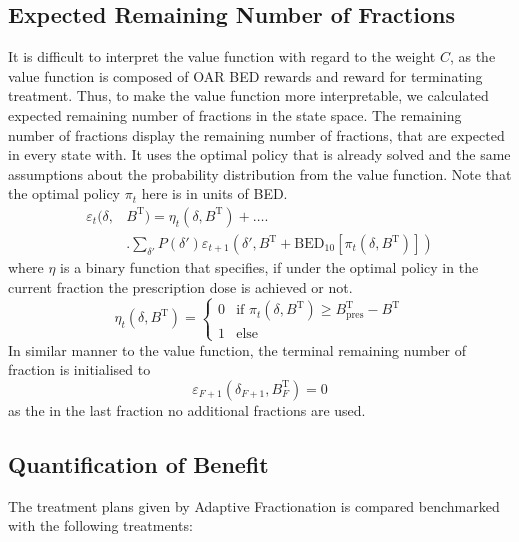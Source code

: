 \documentclass[\relativeRoot/ada.tex]{subfiles}
\begin{document}
\subsection{Expected Remaining Number of Fractions}
It is difficult to interpret the value function with regard to the weight $C$, as the value function is composed of OAR BED rewards and reward for terminating treatment. Thus, to make the value function more interpretable, we calculated expected remaining number of fractions in the state space. The remaining number of fractions display the remaining number of fractions, that are expected in every state with. It uses the optimal policy that is already solved and the same assumptions about the probability distribution from the value function. Note that the optimal policy $\pi_t$ here is in units of BED.
\begin{equation}\label{eq:remains_function}
    \begin{split}
    \varepsilon_t(\delta, & B^{\text{T}}) =
    \eta _t (\delta, B^{\text{T}}) + \ldots \Biggr.\\
    & \Biggr. \sum_{\delta'}P(\delta') \varepsilon_{t+1} \left( \delta', B^{\text{T}} + \text{BED}_{10} \left[ \pi_t(\delta, B^{\text{T}}) \right] \right)
    \end{split}
\end{equation}
where $\eta$ is a binary function that specifies, if under the optimal policy in the current fraction the prescription dose is achieved or not.
\begin{equation}\label{eq:current_remains}
    \eta_t (\delta, B^{\text{T}}) =
    \begin{cases}
        0 & \text{if } \pi_t(\delta, B^{\text{T}}) \geq B_{\text{pres}}^{\text{T}} - B^{\text{T}} \\
        1 & \text{else}
    \end{cases}
\end{equation}
In similar manner to the value function, the terminal remaining number of fraction is initialised to
\begin{equation*}
    \varepsilon_{F+1}(\delta_{F+1}, B^\text{T}_{F}) = 0
\end{equation*}
as the in the last fraction no additional fractions are used.

\subsection{Quantification of Benefit}

The treatment plans given by Adaptive Fractionation is compared benchmarked with the following treatments:
\end{document}
